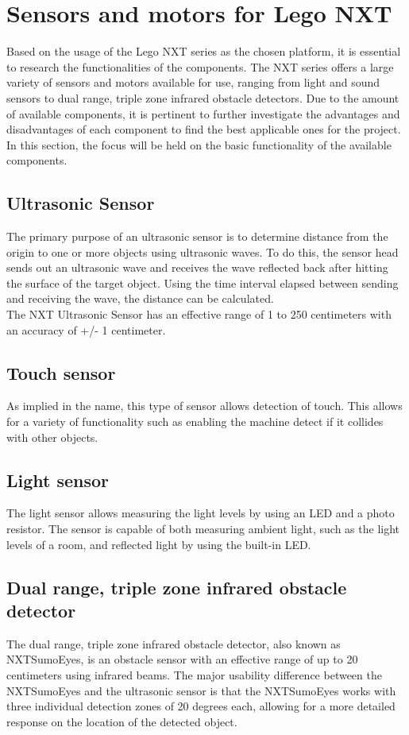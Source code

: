 \section{Sensors and motors for Lego NXT}
\label{sec:sensors}
Based on the usage of the Lego NXT series as the chosen platform, it is essential to research the functionalities of the components. 
The NXT series offers a large variety of sensors and motors available for use, ranging from light and sound sensors to dual range, triple zone infrared obstacle detectors.
Due to the amount of available components, it is pertinent to further investigate the advantages and disadvantages of each component to find the best applicable ones for the project.\\
In this section, the focus will be held on the basic functionality of the available components.

\subsection{Ultrasonic Sensor}
The primary purpose of an ultrasonic sensor is to determine distance from the origin to one or more objects using ultrasonic waves.
To do this, the sensor head sends out an ultrasonic wave and receives the wave reflected back after hitting the surface of the target object.
Using the time interval elapsed between sending and receiving the wave, the distance can be calculated.\\
The NXT Ultrasonic Sensor has an effective range of 1 to 250 centimeters with an accuracy of +/- 1 centimeter.

\subsection*{Touch sensor}
As implied in the name, this type of sensor allows detection of touch.
This allows for a variety of functionality such as enabling the machine detect if it collides with other objects.

\subsection*{Light sensor}
The light sensor allows measuring the light levels by using an LED and a photo resistor.
The sensor is capable of both measuring ambient light, such as the light levels of a room, and reflected light by using the built-in LED.

\subsection*{Dual range, triple zone infrared obstacle detector}
The dual range, triple zone infrared obstacle detector, also known as NXTSumoEyes, is an obstacle sensor with an effective range of up to 20 centimeters using infrared beams.
The major usability difference between the NXTSumoEyes and the ultrasonic sensor is that the NXTSumoEyes works with three individual detection zones of 20 degrees each, allowing for a more detailed response on the location of the detected object.

